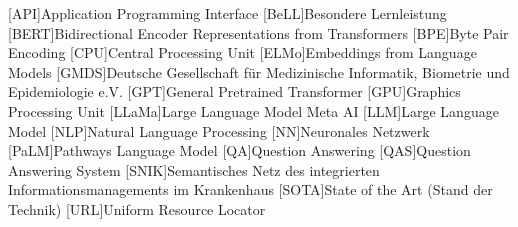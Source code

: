 \begin{acronym}[SPARQL]
    [API]{Application Programming Interface}
    [BeLL]{Besondere Lernleistung}
    [BERT]{Bidirectional Encoder Representations from Transformers}
    [BPE]{Byte Pair Encoding}
    [CPU]{Central Processing Unit}
    [ELMo]{Embeddings from Language Models}
    [GMDS]{Deutsche Gesellschaft für Medizinische Informatik, Biometrie und Epidemiologie e.V.}
    [GPT]{General Pretrained Transformer}
    [GPU]{Graphics Processing Unit}
    [LLaMa]{Large Language Model Meta AI}
    [LLM]{Large Language Model}
    [NLP]{Natural Language Processing}
    [NN]{Neuronales Netzwerk}
    [PaLM]{Pathways Language Model}
    [QA]{Question Answering}
    [QAS]{Question Answering System}
    [SNIK]{Semantisches Netz des integrierten Informationsmanagements im Krankenhaus}
    [SOTA]{State of the Art (Stand der Technik)}
    [URL]{Uniform Resource Locator}
\end{acronym}
